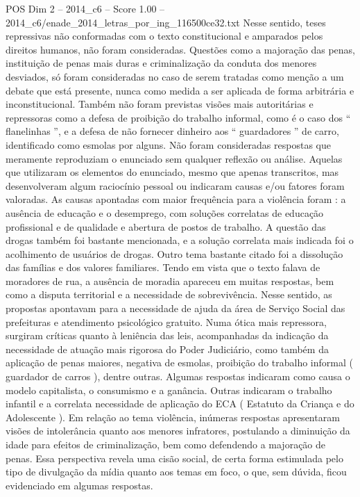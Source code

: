 \begin{textsample}{POS Dim 2 – 2014\_c6 – Score 1.00 – 2014\_c6/enade\_2014\_letras\_por\_ing\_116500ce32.txt}
Nesse sentido, teses repressivas não conformadas com o texto constitucional e amparados pelos direitos humanos, não foram consideradas.
Questões como a majoração das penas, instituição de penas mais duras e criminalização da conduta dos menores desviados, só foram consideradas no caso de serem tratadas como menção a um debate que está presente, nunca como medida a ser aplicada de forma arbitrária e inconstitucional.
Também não foram previstas visões mais autoritárias e repressoras como a defesa de proibição do trabalho informal, como é o caso dos “ flanelinhas ”, e a defesa de não fornecer dinheiro aos “ guardadores ” de carro, identificado como esmolas por alguns.
Não foram consideradas respostas que meramente reproduziam o enunciado sem qualquer reflexão ou análise.
Aquelas que utilizaram os elementos do enunciado, mesmo que apenas transcritos, mas desenvolveram algum raciocínio pessoal ou indicaram causas e/ou fatores foram valoradas.
As causas apontadas com maior frequência para a violência foram : a ausência de educação e o desemprego, com soluções correlatas de educação profissional e de qualidade e abertura de postos de trabalho.
A questão das drogas também foi bastante mencionada, e a solução correlata mais indicada foi o acolhimento de usuários de drogas.
Outro tema bastante citado foi a dissolução das famílias e dos valores familiares.
Tendo em vista que o texto falava de moradores de rua, a ausência de moradia apareceu em muitas respostas, bem como a disputa territorial e a necessidade de sobrevivência.
Nesse sentido, as propostas apontavam para a necessidade de ajuda da área de Serviço Social das prefeituras e atendimento psicológico gratuito.
Numa ótica mais repressora, surgiram críticas quanto à leniência das leis, acompanhadas da indicação da necessidade de atuação mais rigorosa do Poder Judiciário, como também da aplicação de penas maiores, negativa de esmolas, proibição do trabalho informal ( guardador de carros ), dentre outras.
Algumas respostas indicaram como causa o modelo capitalista, o consumismo e a ganância.
Outras indicaram o trabalho infantil e a correlata necessidade de aplicação do ECA ( Estatuto da Criança e do Adolescente ).
Em relação ao tema violência, inúmeras respostas apresentaram visões de intolerância quanto aos menores infratores, postulando a diminuição da idade para efeitos de criminalização, bem como defendendo a majoração de penas.
Essa perspectiva revela uma cisão social, de certa forma estimulada pelo tipo de divulgação da mídia quanto aos temas em foco, o que, sem dúvida, ficou evidenciado em algumas respostas.

\end{textsample}
